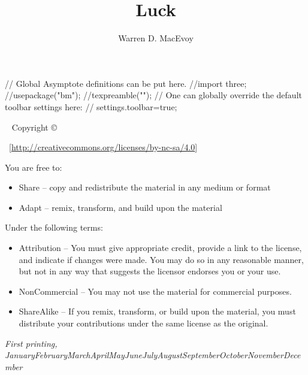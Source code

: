\documentclass{tufte-book} %
\title{Luck} %
\author[W. MacEvoy]{Warren D. MacEvoy} %
\theoremstyle{definition}
\theoremstyle{example}
\theoremstyle{theorem}
\newcommand{\monthyear}{\ifcase\month\or January\or February\or March\or April\or May\or June\or July\or August\or September\or October\or November\or December\fi\space\number\year} %
\begin{document}
\def\asydir{graphics}
\begin{asydef}
// Global Asymptote definitions can be put here.
//import three;
//usepackage("bm");
//texpreamble("\def\V#1{\bm{#1}}");
// One can globally override the default toolbar settings here:
// settings.toolbar=true;
\end{asydef}
\frontmatter
\maketitle %


\newpage
\begin{fullwidth}
~\vfill
\thispagestyle{empty}
\setlength{\parindent}{0pt}
\setlength{\parskip}{\baselineskip}
Copyright \copyright\ \the\year\ \thanklessauthor

\par{}

\par{}

\par \ccbyncsa\ [\url{http://creativecommons.org/licenses/by-nc-sa/4.0}]

You are free to:
\begin{itemize}
    \item Share -- copy and redistribute the material in any medium or format
    \item Adapt -- remix, transform, and build upon the material
\end{itemize}
Under the following terms:
\begin{itemize}
\item Attribution -- You must give appropriate credit, provide a link to the license, and indicate if changes were made. You may do so in any reasonable manner, but not in any way that suggests the licensor endorses you or your use.
\item NonCommercial -- You may not use the material for commercial purposes.
\item ShareAlike -- If you remix, transform, or build upon the material, you must distribute your contributions under the same license as the original. 
\end{itemize}

\par\textit{First printing, \monthyear}
\end{fullwidth}
\end{document}
